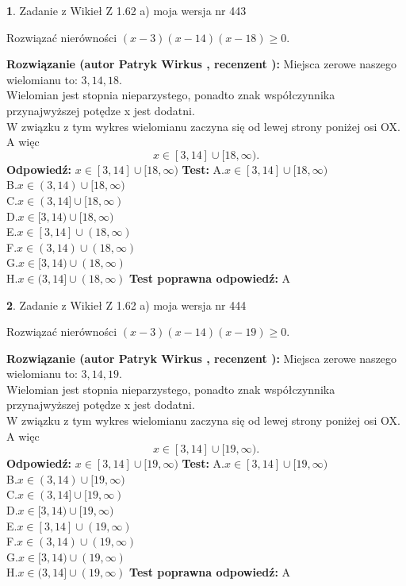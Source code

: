 \documentclass[12pt, a4paper]{article}
\theoremstyle{definition} %
\newtheorem{zad}{}
\newcommand{\zadStart}[1]{\begin{zad}#1\newline}
\newcommand{\zadStop}{\end{zad}}
\newcommand{\rozwStart}[2]{\noindent \textbf{Rozwiązanie (autor #1 , recenzent #2): }\newline}
\newcommand{\rozwStop}{\newline}
\newcommand{\odpStart}{\noindent \textbf{Odpowiedź:}\newline}
\newcommand{\odpStop}{\newline}
\newcommand{\testStart}{\noindent \textbf{Test:}\newline}
\newcommand{\testStop}{\newline}
\newcommand{\kluczStart}{\noindent \textbf{Test poprawna odpowiedź:}\newline}
\newcommand{\kluczStop}{\newline}
\begin{document}
\zadStart{Zadanie z Wikieł Z 1.62 a) moja wersja nr 443}

Rozwiązać nierówności $(x-3)(x-14)(x-18)\ge0$.
\zadStop
\rozwStart{Patryk Wirkus}{}
Miejsca zerowe naszego wielomianu to: $3, 14, 18$.\\
Wielomian jest stopnia nieparzystego, ponadto znak współczynnika przy\linebreak najwyższej potędze x jest dodatni.\\ W związku z tym wykres wielomianu zaczyna się od lewej strony poniżej osi OX. A więc $$x \in [3,14] \cup [18,\infty).$$
\rozwStop
\odpStart
$x \in [3,14] \cup [18,\infty)$
\odpStop
\testStart
A.$x \in [3,14] \cup [18,\infty)$\\
B.$x \in (3,14) \cup [18,\infty)$\\
C.$x \in (3,14] \cup [18,\infty)$\\
D.$x \in [3,14) \cup [18,\infty)$\\
E.$x \in [3,14] \cup (18,\infty)$\\
F.$x \in (3,14) \cup (18,\infty)$\\
G.$x \in [3,14) \cup (18,\infty)$\\
H.$x \in (3,14] \cup (18,\infty)$
\testStop
\kluczStart
A
\kluczStop



\zadStart{Zadanie z Wikieł Z 1.62 a) moja wersja nr 444}

Rozwiązać nierówności $(x-3)(x-14)(x-19)\ge0$.
\zadStop
\rozwStart{Patryk Wirkus}{}
Miejsca zerowe naszego wielomianu to: $3, 14, 19$.\\
Wielomian jest stopnia nieparzystego, ponadto znak współczynnika przy\linebreak najwyższej potędze x jest dodatni.\\ W związku z tym wykres wielomianu zaczyna się od lewej strony poniżej osi OX. A więc $$x \in [3,14] \cup [19,\infty).$$
\rozwStop
\odpStart
$x \in [3,14] \cup [19,\infty)$
\odpStop
\testStart
A.$x \in [3,14] \cup [19,\infty)$\\
B.$x \in (3,14) \cup [19,\infty)$\\
C.$x \in (3,14] \cup [19,\infty)$\\
D.$x \in [3,14) \cup [19,\infty)$\\
E.$x \in [3,14] \cup (19,\infty)$\\
F.$x \in (3,14) \cup (19,\infty)$\\
G.$x \in [3,14) \cup (19,\infty)$\\
H.$x \in (3,14] \cup (19,\infty)$
\testStop
\kluczStart
A
\kluczStop
\end{document}
